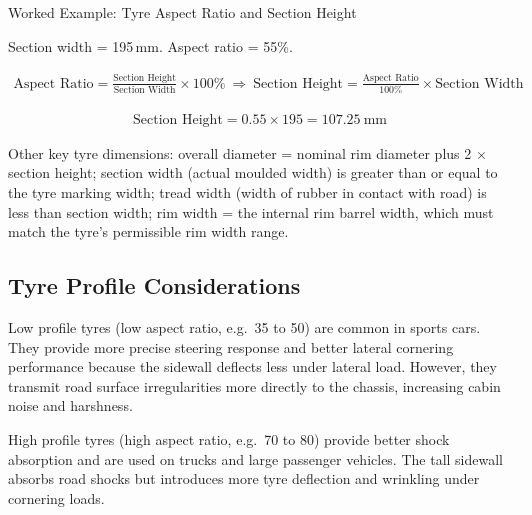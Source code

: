 \documentclass[10pt,a4paper]{article}
\begin{document}
\begin{examplebox}{Worked Example: Tyre Aspect Ratio and Section Height}

Section width = 195\,mm. Aspect ratio = 55\%.

\begin{align}
\text{Aspect Ratio} = \frac{\text{Section Height}}{\text{Section Width}} \times 100\%
\ \Rightarrow\
\text{Section Height} = \frac{\text{Aspect Ratio}}{100\%} \times \text{Section Width}
\end{align}

\begin{align}
\text{Section Height} = 0.55 \times 195 = 107.25\ \text{mm}
\end{align}

\end{examplebox}

Other key tyre dimensions: overall diameter = nominal rim diameter plus 2 $\times$ section height; section width (actual moulded width) is greater than or equal to the tyre marking width; tread width (width of rubber in contact with road) is less than section width; rim width = the internal rim barrel width, which must match the tyre's permissible rim width range.

\subsection{Tyre Profile Considerations}

Low profile tyres (low aspect ratio, e.g.\ 35 to 50) are common in sports cars. They provide more precise steering response and better lateral cornering performance because the sidewall deflects less under lateral load. However, they transmit road surface irregularities more directly to the chassis, increasing cabin noise and harshness.

High profile tyres (high aspect ratio, e.g.\ 70 to 80) provide better shock absorption and are used on trucks and large passenger vehicles. The tall sidewall absorbs road shocks but introduces more tyre deflection and wrinkling under cornering loads.
\end{document}
